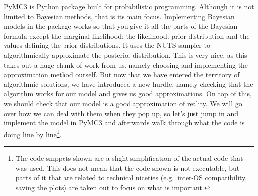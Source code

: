 \documentclass[12pt,a4paper,leqno]{report}
\theoremstyle{plain}
\theoremstyle{definition}
\theoremstyle{remark}
\begin{document}
PyMC3 is Python package built for probabilistic programming. Although it is not
limited to Bayesian methods, that is its main focus. Implementing Bayesian models in
the package works so that you give it all the parts of the Bayesian formula except the
marginal likelihood: the likelihood, prior
distribution and the values defining the prior distributions. It uses the NUTS
sampler\cite{nuts} to algorithmically approximate the posterior distribution. This is
very nice, as this takes out a huge chunk of work from us, namely choosing and
implementing the approximation method
ourself. But now that we have entered the territory of algorithmic solutions, we have
introduced a new hurdle, namely checking that the algorithm works for our
model and gives us good approximations. On top of this, we should check that our model is a good
approximation of reality. We will go over how  we can deal with them when they pop up, so let's just jump in and
implement the model in PyMC3 and afterwards walk through what the code is
doing line by line\footnote{The code snippets shown are a
slight simplification of the actual code that was used. This does not mean
that the code shown is not executable, but parts of it that are related to technical niceties
(e.g.\ inter-OS compatibility, saving the plots) are taken out to focus on what is
important.}.

\pagebreak
\end{document}
